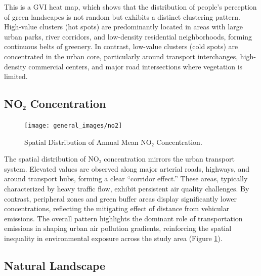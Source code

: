 \documentclass[
  12pt,
  oneside]{book}
\begin{document}
This is a GVI heat map, which shows that the distribution of people's perception of green landscapes is not random but exhibits a distinct clustering pattern. High-value clusters (hot spots) are predominantly located in areas with large urban parks, river corridors, and low-density residential neighborhoods, forming continuous belts of greenery. In contrast, low-value clusters (cold spots) are concentrated in the urban core, particularly around transport interchanges, high-density commercial centers, and major road intersections where vegetation is limited.

\subsection{NO₂ Concentration}\label{noux2082-concentration}

\begin{figure}

{\centering \texttt{[image: general\_images/no2]} 

}

\caption{Spatial Distribution of Annual Mean NO₂ Concentration.}\label{fig:no2}
\end{figure}

The spatial distribution of NO₂ concentration mirrors the urban transport system. Elevated values are observed along major arterial roads, highways, and around transport hubs, forming a clear ``corridor effect.'' These areas, typically characterized by heavy traffic flow, exhibit persistent air quality challenges. By contrast, peripheral zones and green buffer areas display significantly lower concentrations, reflecting the mitigating effect of distance from vehicular emissions. The overall pattern highlights the dominant role of transportation emissions in shaping urban air pollution gradients, reinforcing the spatial inequality in environmental exposure across the study area (Figure \ref{fig:no2}).

\subsection{Natural Landscape}\label{natural-landscape}
\end{document}
